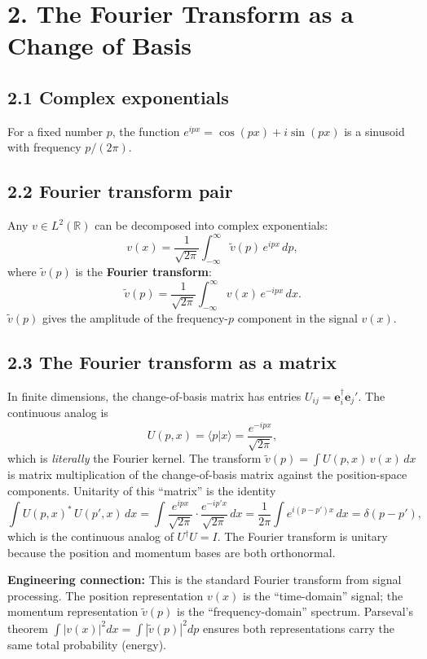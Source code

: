 \documentclass[12pt,a4paper]{article}
\begin{document}
\section{2. The Fourier Transform as a Change of Basis}

\subsection{2.1 Complex exponentials}
For a fixed number $p$, the function $e^{ipx} = \cos(px) + i\sin(px)$ is a sinusoid with frequency $p/(2\pi)$.

\subsection{2.2 Fourier transform pair}
Any $v \in L^2(\mathbb{R})$ can be decomposed into complex exponentials:
\[
    \boxed{v(x) = \frac{1}{\sqrt{2\pi}}\int_{-\infty}^{\infty} \tilde{v}(p)\,e^{ipx}\,dp,}
\]
where $\tilde{v}(p)$ is the \textbf{Fourier transform}:
\[
    \boxed{\tilde{v}(p) = \frac{1}{\sqrt{2\pi}}\int_{-\infty}^{\infty} v(x)\,e^{-ipx}\,dx.}
\]
$\tilde{v}(p)$ gives the amplitude of the frequency-$p$ component in the signal $v(x)$.

\subsection{2.3 The Fourier transform as a matrix}
In finite dimensions, the change-of-basis matrix has entries $U_{ij} = \mathbf{e}_i^\dagger\mathbf{e}_j'$.  The continuous analog is
\[
    U(p,x) = \langle p | x \rangle = \frac{e^{-ipx}}{\sqrt{2\pi}},
\]
which is \emph{literally} the Fourier kernel.  The transform $\tilde{v}(p) = \int U(p,x)\,v(x)\,dx$ is matrix multiplication of the change-of-basis matrix against the position-space components.  Unitarity of this ``matrix'' is the identity
\[
    \int U(p,x)^*\,U(p',x)\,dx = \int \frac{e^{ipx}}{\sqrt{2\pi}}\cdot\frac{e^{-ip'x}}{\sqrt{2\pi}}\,dx = \frac{1}{2\pi}\int e^{i(p-p')x}\,dx = \delta(p-p'),
\]
which is the continuous analog of $U^\dagger U = I$.  The Fourier transform is unitary because the position and momentum bases are both orthonormal.

\medskip
\noindent\textbf{Engineering connection:} This is the standard Fourier transform from signal processing.  The position representation $v(x)$ is the ``time-domain'' signal; the momentum representation $\tilde{v}(p)$ is the ``frequency-domain'' spectrum.  Parseval's theorem $\int|v(x)|^2 dx = \int|\tilde{v}(p)|^2 dp$ ensures both representations carry the same total probability (energy).
\end{document}
